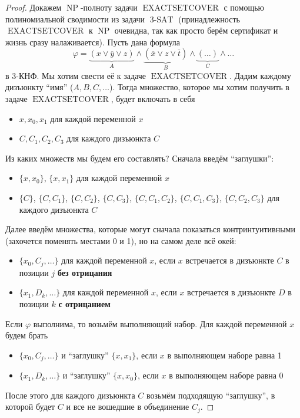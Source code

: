 \documentclass[11pt]{article}
\DeclareMathOperator{\tSAT}{3-SAT}
\DeclareMathOperator{\NP}{NP}
\DeclareMathOperator{\EXACTSETC}{EXACTSETCOVER}
\begin{document}
\begin{proof}
  Докажем $\NP$-полноту задачи $\EXACTSETC$ с помощью полиномиальной сводимости из задачи $\tSAT$ (принадлежность $\EXACTSETC$ к $\NP$ очевидна, 
  так как просто берём сертификат и жизнь сразу налаживается). 
  Пусть дана формула 
  \[\varphi = \underbrace{(x \vee \overline{y} \vee z)}_{A} \wedge 
  \underbrace{(\overline{x} \vee z \vee \overline{t})}_{B} \wedge 
  \underbrace{(\ldots)}_{C} \wedge {\ldots}\]
  в 3-КНФ. Мы хотим свести её к задаче $\EXACTSETC$. Дадим каждому дизъюнкту ``имя'' ($A, B, C, \ldots$). 
  Тогда множество, которое мы хотим получить в задаче $\EXACTSETC$, будет включать в себя
  \begin{itemize}
    \item $x, x_0, x_1$ для каждой переменной $x$
    \item $C, C_1, C_2, C_3$ для каждого дизъюнкта $C$
  \end{itemize}
  Из каких множеств мы будем его составлять? Сначала введём ``заглушки'':
  \begin{itemize}
    \item $\{x, x_0\}$, $\{x, x_1\}$ для каждой переменной $x$
    \item $\{C\}$, $\{C, C_1\}$, $\{C, C_2\}$, $\{C, C_3\}$, $\{C, C_1, C_2\}$, $\{C, C_1, C_3\}$, $\{C, C_2, C_3\}$ для каждого дизъюнкта $C$
  \end{itemize}
  Далее введём множества, которые могут сначала показаться контринтуитивными (захочется поменять местами 0 и 1), но на самом деле всё окей:
  \begin{itemize}
    \item $\{x_0, C_j, \ldots\}$ для каждой переменной $x$, если $x$ встречается в дизъюнкте $C$ в позиции $j$ \textbf{без отрицания}
    \item $\{x_1, D_k, \ldots\}$ для каждой переменной $x$, если $x$ встречается в дизъюнкте $D$ в позиции $k$ \textbf{с отрицанием}
  \end{itemize}
  Если $\varphi$ выполнима, то возьмём выполняющий набор. Для каждой переменной $x$ будем брать 
  \begin{itemize}
    \item $\{x_0, C_j, \ldots\}$ и ``заглушку'' $\{x, x_1\}$, если $x$ в выполняющем наборе равна 1
    \item $\{x_1, D_k, \ldots\}$ и ``заглушку'' $\{x, x_0\}$, если $x$ в выполняющем наборе равна 0
  \end{itemize}
  После этого для каждого дизъюнкта $C$ возьмём подходящую ``заглушку'', в которой будет $C$ и все не вошедшие в объединение $C_j$. 

\end{proof}
\end{document}
